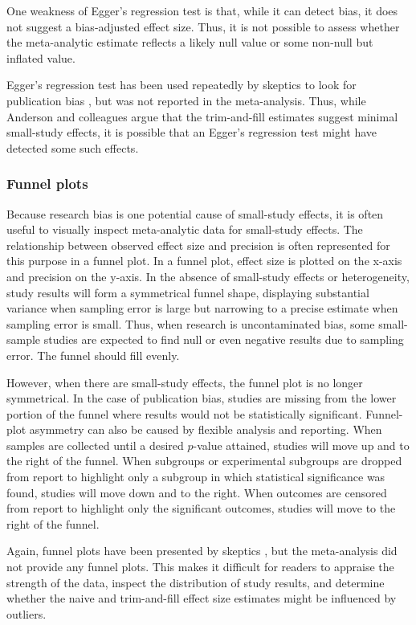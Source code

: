 \documentclass[man]{apa6}
\begin{document}
One weakness of Egger's regression test is that, while it can detect bias, it does not suggest a bias-adjusted effect size. Thus, it is not possible to assess whether the meta-analytic estimate reflects a likely null value or some non-null but inflated value. 

Egger's regression test has been used repeatedly by skeptics to look for publication bias \citep[e.g.,][]{Ferguson:2007,Ferguson:Kilburn:2009}, but was not reported in the \citet{Anderson:etal:2010} meta-analysis. Thus, while Anderson and colleagues argue that the trim-and-fill estimates suggest minimal small-study effects, it is possible that an Egger's regression test might have detected some such effects.

\subsubsection{Funnel plots}
Because research bias is one potential cause of small-study effects, it is often useful to visually inspect meta-analytic data for small-study effects. The relationship between observed effect size and precision is often represented for this purpose in a funnel plot. In a funnel plot, effect size is plotted on the x-axis and precision on the y-axis. In the absence of small-study effects or heterogeneity, study results will form a symmetrical funnel shape, displaying substantial variance when sampling error is large but narrowing to a precise estimate when sampling error is small. Thus, when research is uncontaminated bias, some small-sample studies are expected to find null or even negative results due to sampling error. The funnel should fill evenly.

However, when there are small-study effects, the funnel plot is no longer symmetrical. In the case of publication bias, studies are missing from the lower portion of the funnel where results would not be statistically significant. Funnel-plot asymmetry can also be caused by flexible analysis and reporting. When samples are collected until a desired $p$-value attained, studies will move up and to the right of the funnel. When subgroups or experimental subgroups are dropped from report to highlight only a subgroup in which statistical significance was found, studies will move down and to the right. When outcomes are censored from report to highlight only the significant outcomes, studies will move to the right of the funnel.

Again, funnel plots have been presented by skeptics \citep[e.g.,][]{Ferguson:2007}, but the \citet{Anderson:etal:2010} meta-analysis did not provide any funnel plots. This makes it difficult for readers to appraise the strength of the data, inspect the distribution of study results, and determine whether the naive and trim-and-fill effect size estimates might be influenced by outliers.
\end{document}
